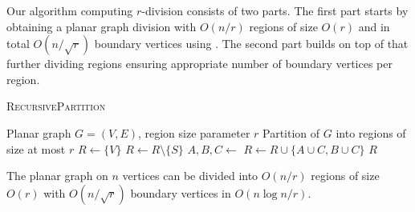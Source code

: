 Our algorithm computing $r$-division consists of two parts. The first part starts by obtaining a planar graph division with $O(n/r)$ regions of size $O(r)$ and in total $O(n/\sqrt{r})$ boundary vertices using . The second part builds on top of that further dividing regions ensuring appropriate number of boundary vertices per region.
\begin{algorithm}
\caption{\textsc{RecursivePartition}}\label{firstPart}
\begin{algorithmic}[1]
\Require Planar graph $G = (V, E)$, region size parameter $r$
\Ensure Partition of $G$ into regions of size at most $r$
    \State  $R \gets \{V\}$
        \State $R \gets R \setminus \{S\}$
        \State $A,B,C \gets$ 
        \State $R \gets R \cup \{A \cup C, B \cup C\}$
    \EndWhile
    \State \Return $R$
\EndProcedure

\end{algorithmic}
\end{algorithm}

\begin{lemma}
    The planar graph on $n$ vertices can be divided into $O(n/r)$ regions of size $O(r)$ with $O(n/\sqrt{r})$ boundary vertices in $O(n \log{n/r})$.
\end{lemma}

